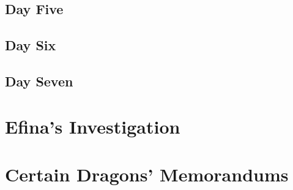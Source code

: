 \documentclass[13pt]{extarticle}
\begin{document}
	\subsection*{Day Five}

	\subsection*{Day Six}

	\subsection*{Day Seven}

	
	\section{Efina’s Investigation}
	
	\section{Certain Dragons’ Memorandums}
	
	
\end{document}
